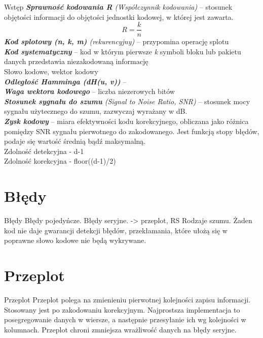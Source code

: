 \documentclass[12pt]{beamer}
\begin{document}
\begin{frame}{Wstęp}
	\emph{\textbf{Sprawność kodowania R} (Współczynnik kodowania)} -- stosunek objętości informacji do objętości jednostki kodowej, w której jest zawarta.\\
	\begin{equation}
	R=\frac{k}{n}
	\end{equation}
	\emph{\textbf{Kod splotowy (n, k, m)} (rekurencyjny)} -- przypomina 				operację splotu\\
	\emph{\textbf{Kod systematyczny}} -- kod w którym pierwsze \emph{k} symboli bloku lub pakietu danych przedstawia niezakodowaną informację\\
	Słowo kodowe, wektor kodowy\\
	\emph{\textbf{Odległość Hamminga (dH(u, v))}} --\\
	\emph{\textbf{Waga wektora kodowego}} -- liczba niezerowych bitów\\
	\emph{\textbf{Stosunek sygnału do szumu} (Signal to Noise Ratio, SNR)} -- stosunek mocy sygnału użytecznego do szumu, zazwyczaj wyrażany w dB.\\
	\emph{\textbf{Zysk kodowy}} -- miara efektywności kodu korekcyjnego, obliczana jako różnica pomiędzy SNR sygnału pierwotnego do zakodowanego. Jest funkcją stopy błędów, podaje się wartość średnią bądź maksymalną.\\
	Zdolność detekcyjna -  d-1\\
	Zdolność korekcyjna - floor((d-1)/2)
	
\end{frame}

\section{Błędy}
\begin{frame}{Błędy}
Błędy pojedyńcze.
Błędy seryjne. -> przeplot, RS
Rodzaje szumu.
Żaden kod nie daje gwarancji detekcji błędów, przekłamania, które ułożą się w poprawne słowo kodowe nie będą wykrywane.
\end{frame}

\section{Przeplot}
\begin{frame}{Przeplot}
Przeplot polega na zmienieniu pierwotnej kolejności zapisu informacji. Stosowany jest po zakodowaniu korekcyjnym. Najprostsza implementacja to posegregowanie danych w wiersze, a następnie przesyłanie ich wg kolejności w kolumnach. Przeplot chroni zmniejsza wrażliwość danych na błędy seryjne.
\end{frame}
\end{document}
